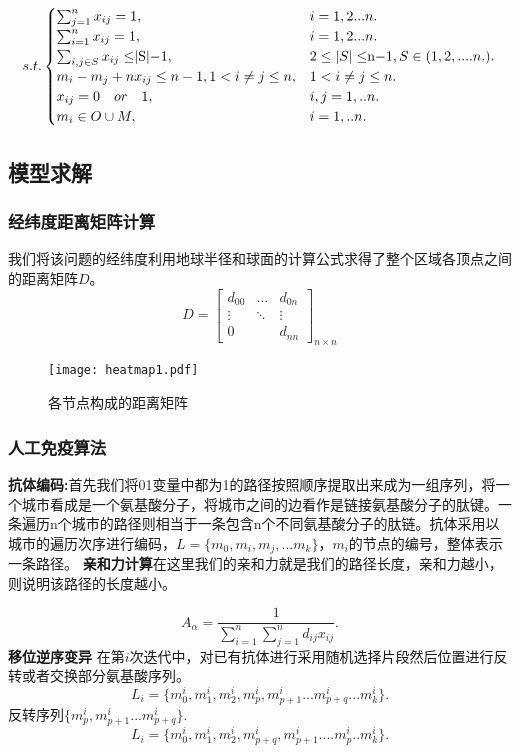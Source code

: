 \documentclass{whutmod}
\begin{document}
\begin{equation}
	s.t.
	\begin{cases} 
		\sum_{j=1}^{n} x_{ij} = 1,&i=1,2...n.\\
		\sum_{i=1}^{n} x_{ij} = 1,&i=1,2...n.\\
		\sum_{i,j\in S}x_{ij}\leq $|S|$-1,& 2\leq |S|\leq $n$-1, S\in(1,2,....n.).\\
		m_i-m_j+nx_{ij}\le n-1,1<i\ne j\le n, & 1<i\ne j\le n. \\
		x_{ij}=0 \quad or \quad 1,& i,j=1,..n.\\
		m_i \in O \cup M,& i=1,..n.
	\end{cases}
\end{equation}

\subsection{模型求解}
\subsubsection{经纬度距离矩阵计算}
我们将该问题的经纬度利用地球半径和球面的计算公式求得了整个区域各顶点之间的距离矩阵$D$。
\begin{equation}
D=\begin{bmatrix}
d_{00} & \dots & d_{0n} \\
\vdots & \ddots & \vdots \\
0 & & d_{nn}
\end{bmatrix}_{n \times n}
\end{equation}
\begin{figure}[!h]
	\centering
	\texttt{[image: heatmap1.pdf]}
	\caption{各节点构成的距离矩阵}
\end{figure}
\newpage
\subsubsection{人工免疫算法}
\textbf{抗体编码:}首先我们将01变量中都为1的路径按照顺序提取出来成为一组序列，将一个城市看成是一个氨基酸分子，将城市之间的边看作是链接氨基酸分子的肽键。一条遍历n个城市的路径则相当于一条包含n个不同氨基酸分子的肽链。抗体采用以城市的遍历次序进行编码，$L=\{m_0,m_i,m_j,...m_k\}$，$m_i$的节点的编号，整体表示一条路径。
\textbf{亲和力计算}在这里我们的亲和力就是我们的路径长度，亲和力越小，则说明该路径的长度越小。

\begin{equation}
A_{\alpha}=\frac{1}{\sum_{i=1}^{n}\sum_{j=1}^nd_{ij}x_{ij}}.
\end{equation}
\textbf{移位逆序变异}
在第$i$次迭代中，对已有抗体进行采用随机选择片段然后位置进行反转或者交换部分氨基酸序列。
$$L_i=\{m_0^i,m_1^i,m_2^i,m_p^i,m_{p+1}^i...m_{p+q}^i...m_k^i\}.$$
反转序列$\{m_p^i,m_{p+1}^i...m_{p+q}^i\}.$\\
$$L_i=\{m_0^i,m_1^i,m_2^i,m_{p+q}^i,m_{p+1}^i....m_p^i..m_k^i\}.$$
\end{document}
